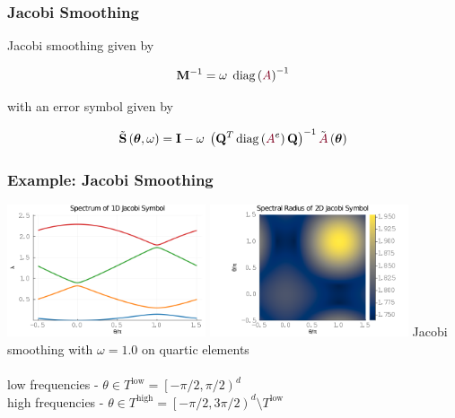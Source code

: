 \documentclass{beamer}
\DeclareMathOperator{\diag}{diag}
\begin{document}

\begin{frame}
\begin{center}
\frametitle{Jacobi Smoothing}

Jacobi smoothing given by

\begin{equation}
\mathbf{M}^{-1} = \omega \hspace{1mm} \diag \left( {\color{burgundy}A} \right)^{-1}
\end{equation}

with an error symbol given by

\begin{equation}
\tilde{\mathbf{S}} \left( \boldsymbol{\theta}, \omega \right) = \mathbf{I} - \omega \hspace{1mm} \left( \mathbf{Q}^T \diag \left( {\color{burgundy}A}^e \right) \mathbf{Q} \right)^{-1} \tilde{{\color{burgundy}A}} \left( \boldsymbol{\theta} \right)
\end{equation}

\end{center}
\end{frame}


\begin{frame}
\begin{center}
\frametitle{Example: Jacobi Smoothing}

\includegraphics[height=3.9cm]{../img/JacobiSymbol1D}
\includegraphics[height=3.9cm]{../img/JacobiSymbol2D}
{\small Jacobi smoothing with $\omega = 1.0$ on quartic elements}\\

~\\

low frequencies - $\theta \in T^{\text{low}} = \left[ - \pi / 2, \pi / 2 \right)^d$\\

high frequencies - $\theta \in T^{\text{high}} = \left[ - \pi / 2, 3 \pi / 2 \right)^d \setminus T^{\text{low}}$

\end{center}
\end{frame}
\end{document}
